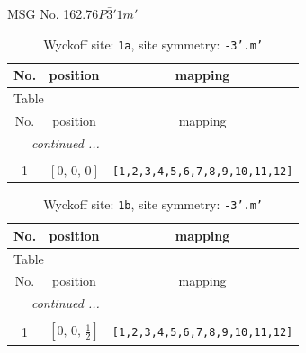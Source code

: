 \documentclass[fleqn,8pt]{jsarticle}
\begin{document}
\setcounter{MaxMatrixCols}{32}

\renewcommand{\tablename}{Table~}
\renewcommand{\figurename}{Figure~}
\begin{center}
\LARGE
MSG No. 162.76\quad$P\bar{3}'1m'$
\end{center}
\renewcommand{\arraystretch}{1.2}
\begin{longtable}{ccc}
\caption{Wyckoff site: {\tt 1a}, site symmetry: {\tt -3'.m'}}
 \\
 \hline \hline
No. & position & mapping \\ \hline \endfirsthead

\multicolumn{2}{l}{\tablename\ \thetable{}} \\
 \hline \hline
No. & position & mapping \\ \hline \endhead

 \hline \hline
\multicolumn{2}{r}{\footnotesize\it continued ...} \\ \endfoot

 \hline \hline
\multicolumn{2}{r}{} \\ \endlastfoot

1 & $\left[ 0,\, 0,\, 0 \right]$ & {\tt [1,2,3,4,5,6,7,8,9,10,11,12]} \\
\end{longtable}
\renewcommand{\arraystretch}{1.2}
\begin{longtable}{ccc}
\caption{Wyckoff site: {\tt 1b}, site symmetry: {\tt -3'.m'}}
 \\
 \hline \hline
No. & position & mapping \\ \hline \endfirsthead

\multicolumn{2}{l}{\tablename\ \thetable{}} \\
 \hline \hline
No. & position & mapping \\ \hline \endhead

 \hline \hline
\multicolumn{2}{r}{\footnotesize\it continued ...} \\ \endfoot

 \hline \hline
\multicolumn{2}{r}{} \\ \endlastfoot

1 & $\left[ 0,\, 0,\, \frac{1}{2} \right]$ & {\tt [1,2,3,4,5,6,7,8,9,10,11,12]} \\
\end{longtable}
\renewcommand{\arraystretch}{1.2}
\end{document}
